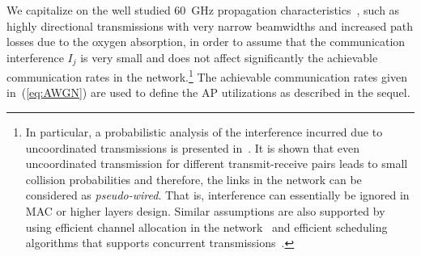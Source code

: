 \documentclass[journal, 10pt, twocolumn]{IEEEtran}
\begin{document}
We capitalize on the well studied 60~GHz propagation characteristics~\cite{Mudumbai09}, such as highly directional transmissions with very narrow beamwidths and increased path losses due to the oxygen absorption, in order to assume that the communication interference $I_j$ is very small and does not affect significantly the achievable communication rates in the network.\footnote{In particular, a probabilistic analysis of the interference incurred due to uncoordinated transmissions is presented in~\cite{Mudumbai09}. It is shown that even uncoordinated transmission for different transmit-receive pairs leads to small collision probabilities and therefore, the links in the network can be considered as \emph{pseudo-wired}. That is, interference can essentially be ignored in MAC or higher layers design. Similar assumptions are also supported by using efficient channel allocation in the network~\cite{Athanasiou08} and efficient scheduling algorithms that supports concurrent transmissions~\cite{Qiao11}.} The achievable communication rates given in~(\ref{eq:AWGN}) are used to define the AP utilizations as described in the sequel.
\end{document}
